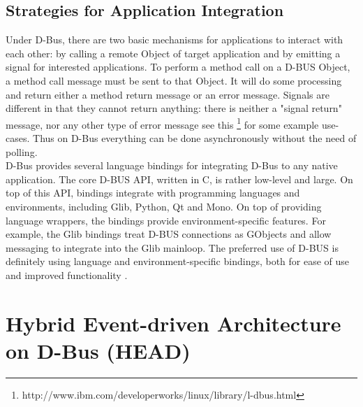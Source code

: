 \documentclass{ifacconf}
\begin{document}
\subsection{Strategies for Application Integration}
Under D-Bus, there are two basic mechanisms for applications to interact with each other: by calling a remote Object of target application and by emitting a signal for  interested applications. To perform a method call on a D-BUS Object, a method call message must be sent to that Object. It will do some processing and return either a method return message or an error message. Signals are different in that they cannot return anything: there is neither a "signal return" message, nor any other type of error message see this \footnote{http://www.ibm.com/developerworks/linux/library/l-dbus.html} for some example use-cases. Thus on D-Bus everything can be done asynchronously without the need of polling.\\ 
D-Bus provides  several language bindings for integrating D-Bus to any native application. The core D-BUS API, written in C, is rather low-level and large. On top of this API, bindings integrate with programming languages and environments, including Glib, Python, Qt and Mono. On top of providing language wrappers, the bindings provide environment-specific features. For example, the Glib bindings treat D-BUS connections as GObjects and allow messaging to integrate into the Glib mainloop. The preferred use of D-BUS is definitely using language and environment-specific bindings, both for ease of use and improved functionality \cite{Love}. 
\section{Hybrid Event-driven Architecture on D-Bus (HEAD)}
\end{document}
